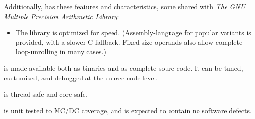 Additionally, \emph{\productbasenameshort{}} has these features and characteristics,
some shared with \emph{The GNU Multiple Precision Arithmetic Library}:

\begin{itemize}
\item The library is optimized for speed.  (Assembly-language for popular
      variants is provided, with a slower C fallback.  Fixed-size operands
      also allow complete loop-unrolling in many cases.)
\end{itemize}

\emph{\productbasenameshort{}} is made available both as binaries and as 
complete soure code.  It can be tuned, customized, and debugged at the 
source code level.  

\emph{\productbasenameshort{}} is thread-safe and core-safe.

\emph{\productbasenameshort{}} is unit tested to MC/DC coverage, and is 
expected to contain no software defects.  

